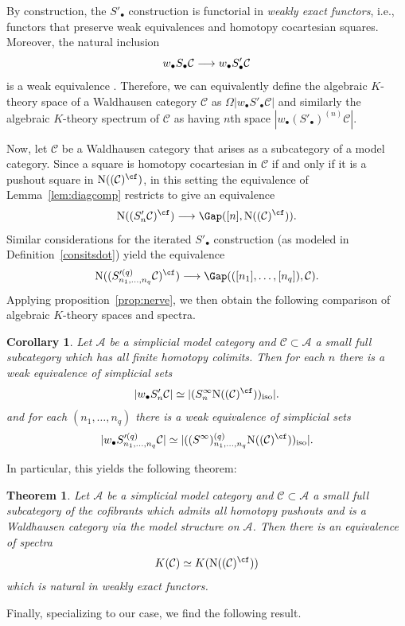 \documentclass{amsart}
\newcommand{\ssdot}{\bullet}%
\newcommand{\subdot}{_\ssdot}
\newcommand{\seqdot}{\bullet,\dotsc,\bullet}
\newcommand{\Spdot}[1][\ssdot]{S'_{#1}}
\newcommand{\Sdot}[1][\ssdot]{S_{#1}}
\newcommand{\Spdotmac}[2]{S'^{(#1)}_{#2}}
\newcommand{\Spdotq}[1][\seqdot]{\Spdotmac{q}{#1}}
\newcommand{\iSdotq}[1][\seqdot]{(S^{\infty})^{(q)}_{#1}}
\newcommand{\htp}{\simeq}
\renewcommand{\to}{\mathchoice{\longrightarrow}{\rightarrow}{\rightarrow}{\rightarrow}}
\let\catsymbfont\mathcal
\newcommand{\aA}{{\catsymbfont{A}}}
\newcommand{\aC}{{\catsymbfont{C}}}
\newcommand{\lkan}[1]{(#1)_{\mathrm{iso}}}
\newcommand{\N}{\mathrm{N}}
\renewcommand{\i}{\infty}
\numberwithin{equation}{section}
\newtheorem{theorem}[equation]{Theorem}
\newtheorem{corollary}[equation]{Corollary}
\theoremstyle{definition}
\begin{document}
By construction, the $\Spdot$ construction is
functorial in {\em weakly exact functors}, i.e., functors that
preserve weak equivalences and homotopy cocartesian squares.
Moreover, the natural inclusion 
\[
w\subdot \Sdot \aC \to w\subdot \Spdot \aC
\]
is a weak equivalence \cite[2.9]{BM3}.  Therefore, we can equivalently
define the algebraic $K$-theory space of a Waldhausen category $\aC$
as $\Omega |w\subdot \Spdot \aC|$ and similarly the algebraic
$K$-theory spectrum of $\aC$ as having $n$th space
$|w\subdot (\Spdot)^{(n)} \aC|$.

Now, let $\aC$ be a Waldhausen category that arises as a subcategory
of a model category.  Since a square is homotopy cocartesian in $\aC$
if and only if it is a pushout square in $\N((\aC)^{\cf})$, in this
setting the equivalence of Lemma~\ref{lem:diagcomp} restricts to give
an equivalence
\[
\N((\Spdot[n] \aC)^{\cf}) \to \Gap([n], \N((\aC)^{\cf})).
\]
Similar considerations for the iterated $\Spdot$
construction \cite[A.5.4]{BM4} (as modeled in
Definition~\ref{consitsdot}) yield the equivalence
\[
\N((\Spdotq[n_{1},\dotsc,n_{q}] \aC)^{\cf}) \to \Gap(([n_1], \dotsc,
[n_q]), \aC).
\]
Applying proposition~\ref{prop:nerve}, we then obtain the following
comparison of algebraic $K$-theory spaces and spectra.

\begin{corollary}\label{cor:Kcomp}
Let $\aA$ be a simplicial model category and $\aC \subset \aA$ a
small full subcategory which has all finite homotopy colimits.  Then
for each $n$ there is a weak equivalence of simplicial sets
\[
|w \subdot \Spdot[n] \aC| \htp |\lkan{\Sdot[n]^{\i}\N((\aC)^{\cf})}|.
\]
and for each $(n_1, \dotsc, n_q)$ there is a weak equivalence of
simplicial sets
\[
|w \subdot \Spdotq[n_{1},\dotsc,n_{q}] \aC| \htp
 |\lkan{\iSdotq[n_{1},\dotsc,n_{q}]\N((\aC)^{\cf})}|.
\]
\end{corollary}

In particular, this yields the following theorem:

\begin{theorem}\label{thm:kconsistency}
Let $\aA$ be a simplicial model category and $\aC \subset \aA$ a small
full subcategory of the cofibrants which admits all homotopy pushouts
and is a Waldhausen category via the model structure on $\aA$.  Then
there is an equivalence of spectra
\[
K(\aC) \htp K(\N((\aC)^{\cf}))
\]
which is natural in weakly exact functors.
\end{theorem}

Finally, specializing to our case, we find the following result.
\end{document}
